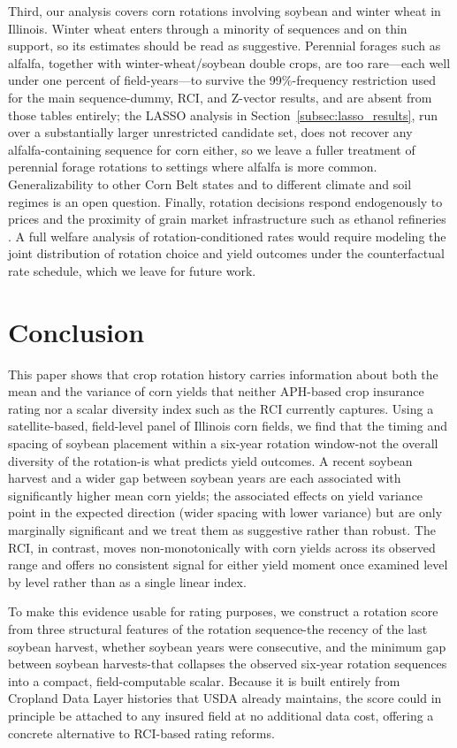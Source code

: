\documentclass[12pt,letterpaper]{article}
\theoremstyle{remark}
\theoremstyle{remark}
\theoremstyle{plain}
\theoremstyle{definition}
\begin{document}
Third, our analysis covers corn rotations involving soybean and winter wheat in Illinois. Winter wheat enters through a minority of sequences and on thin support, so its estimates should be read as suggestive. Perennial forages such as alfalfa, together with winter-wheat/soybean double crops, are too rare---each well under one percent of field-years---to survive the 99\%-frequency restriction used for the main sequence-dummy, RCI, and Z-vector results, and are absent from those tables entirely; the LASSO analysis in Section~\ref{subsec:lasso_results}, run over a substantially larger unrestricted candidate set, does not recover any alfalfa-containing sequence for corn either, so we leave a fuller treatment of perennial forage rotations to settings where alfalfa is more common. Generalizability to other Corn Belt states and to different climate and soil regimes is an open question. Finally, rotation decisions respond endogenously to prices and the proximity of grain market infrastructure such as ethanol refineries \citep{Pates2025,cheu2025}. A full welfare analysis of rotation-conditioned rates would require modeling the joint distribution of rotation choice and yield outcomes under the counterfactual rate schedule, which we leave for future work.

\section{\label{sec:conclusion}Conclusion}
 
This paper shows that crop rotation history carries information about both the mean and the variance of corn yields that neither APH-based crop insurance rating nor a scalar diversity index such as the RCI currently captures. Using a satellite-based, field-level panel of Illinois corn fields, we find that the timing and spacing of soybean placement within a six-year rotation window-not the overall diversity of the rotation-is what predicts yield outcomes. A recent soybean harvest and a wider gap between soybean years are each associated with significantly higher mean corn yields; the associated effects on yield variance point in the expected direction (wider spacing with lower variance) but are only marginally significant and we treat them as suggestive rather than robust. The RCI, in contrast, moves non-monotonically with corn yields across its observed range and offers no consistent signal for either yield moment once examined level by level rather than as a single linear index.

To make this evidence usable for rating purposes, we construct a rotation score from three structural features of the rotation sequence-the recency of the last soybean harvest, whether soybean years were consecutive, and the minimum gap between soybean harvests-that collapses the observed six-year rotation sequences into a compact, field-computable scalar. Because it is built entirely from Cropland Data Layer histories that USDA already maintains, the score could in principle be attached to any insured field at no additional data cost, offering a concrete alternative to RCI-based rating reforms.
\end{document}
